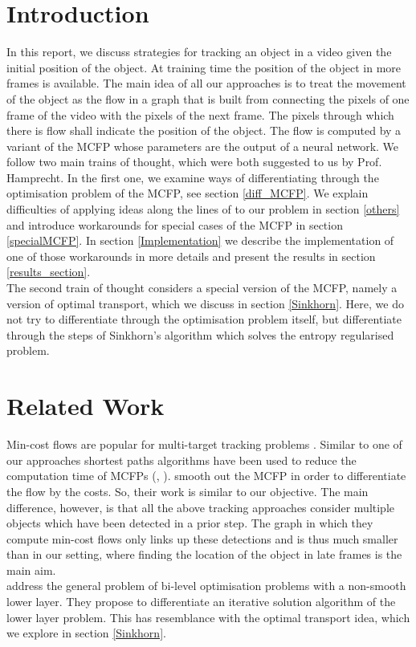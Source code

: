 \documentclass{article}
\begin{document}
\section{Introduction}
In this report, we discuss strategies for tracking an object in a video given the initial position of the object. At training time the position of the object in more frames is available. The main idea of all our approaches is to treat the movement of the object as the flow in a graph that is built from connecting the pixels of one frame of the video with the pixels of the next frame. The pixels through which there is flow shall indicate the position of the object. The flow is computed by a variant of the MCFP whose parameters are the output of a neural network. We follow two main trains of thought, which were both suggested to us by Prof. Hamprecht. In the first one, we examine ways of differentiating through the optimisation problem of the MCFP, see section \ref{diff_MCFP}. We explain difficulties of applying ideas along the lines of \cite{AmosK17} to our problem in section \ref{others} and introduce workarounds for special cases of the MCFP in section \ref{specialMCFP}. In section \ref{Implementation} we describe the implementation of one of those workarounds in more details and present the results in section \ref{results_section}.\\
The second train of thought considers a special version of the MCFP, namely a version of optimal transport, which we discuss in section \ref{Sinkhorn}. Here, we do not try to differentiate through the optimisation problem itself, but differentiate through the steps of Sinkhorn's algorithm which solves the entropy regularised problem.

\section{Related Work}
Min-cost flows are popular for multi-target tracking problems \cite{zha08}. Similar to one of our approaches shortest paths algorithms have been used to reduce the computation time of MCFPs (\cite{ber11}, \cite{lenz15}). \cite{sch17} smooth out the MCFP in order to differentiate the flow by the costs. So, their work is similar to our objective. The main difference, however, is that all the above tracking approaches consider multiple objects which have been detected in a prior step. The graph in which they compute min-cost flows only links up these detections and is thus much smaller than in our setting, where finding the location of the object in late frames is the main aim.\\
\cite{ochs15} address the general problem of bi-level optimisation problems with a non-smooth lower layer. They propose to differentiate an iterative solution algorithm of the lower layer problem. This has resemblance with the optimal transport idea, which we explore in section \ref{Sinkhorn}. 
\end{document}

